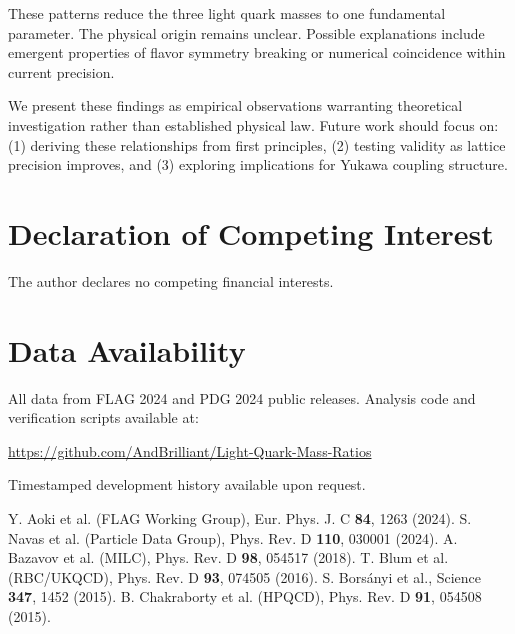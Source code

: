 \documentclass[12pt]{article}
\begin{document}
These patterns reduce the three light quark masses to one fundamental parameter. The physical origin remains unclear. Possible explanations include emergent properties of flavor symmetry breaking or numerical coincidence within current precision.

We present these findings as empirical observations warranting theoretical investigation rather than established physical law. Future work should focus on: (1) deriving these relationships from first principles, (2) testing validity as lattice precision improves, and (3) exploring implications for Yukawa coupling structure.

\section*{Declaration of Competing Interest}
The author declares no competing financial interests.

\section*{Data Availability}
All data from FLAG 2024 and PDG 2024 public releases. Analysis code and verification scripts available at:

\url{https://github.com/AndBrilliant/Light-Quark-Mass-Ratios}

Timestamped development history available upon request.

\begin{thebibliography}{99}

 Y. Aoki et al. (FLAG Working Group), Eur. Phys. J. C \textbf{84}, 1263 (2024).
 S. Navas et al. (Particle Data Group), Phys. Rev. D \textbf{110}, 030001 (2024).
 A. Bazavov et al. (MILC), Phys. Rev. D \textbf{98}, 054517 (2018).
 T. Blum et al. (RBC/UKQCD), Phys. Rev. D \textbf{93}, 074505 (2016).
 S. Borsányi et al., Science \textbf{347}, 1452 (2015).
 B. Chakraborty et al. (HPQCD), Phys. Rev. D \textbf{91}, 054508 (2015).

\end{thebibliography}
\end{document}
